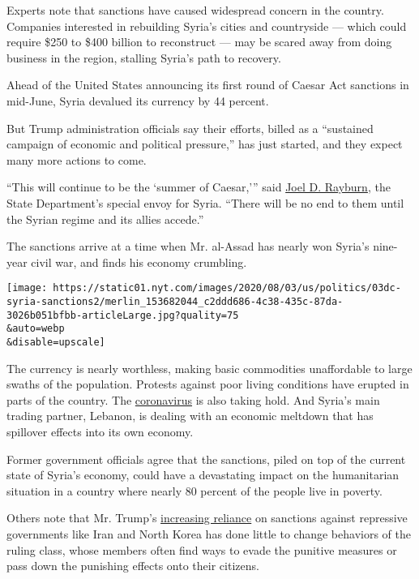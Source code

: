 Experts note that sanctions have caused widespread concern in the
country. Companies interested in rebuilding Syria's cities and
countryside --- which could require \$250 to \$400 billion to
reconstruct --- may be scared away from doing business in the region,
stalling Syria's path to recovery.

Ahead of the United States announcing its first round of Caesar Act
sanctions in mid-June, Syria devalued its currency by 44 percent.

But Trump administration officials say their efforts, billed as a
``sustained campaign of economic and political pressure,'' has just
started, and they expect many more actions to come.

``This will continue to be the `summer of Caesar,''' said
\href{https://www.state.gov/biographies/joel-d-rayburn/}{Joel D.
Rayburn}, the State Department's special envoy for Syria. ``There will
be no end to them until the Syrian regime and its allies accede.''

The sanctions arrive at a time when Mr. al-Assad has nearly won Syria's
nine-year civil war, and finds his economy crumbling.

\texttt{[image: https://static01.nyt.com/images/2020/08/03/us/politics/03dc-syria-sanctions2/merlin\_153682044\_c2ddd686-4c38-435c-87da-3026b051bfbb-articleLarge.jpg?quality=75\\\&auto=webp\\\&disable=upscale]}

The currency is nearly worthless, making basic commodities unaffordable
to large swaths of the population. Protests against poor living
conditions have erupted in parts of the country. The
\href{https://www.nytimes.com/interactive/2020/world/coronavirus-maps.html}{coronavirus}
is also taking hold. And Syria's main trading partner, Lebanon, is
dealing with an economic meltdown that has spillover effects into its
own economy.

Former government officials agree that the sanctions, piled on top of
the current state of Syria's economy, could have a devastating impact on
the humanitarian situation in a country where nearly 80 percent of the
people live in poverty.

Others note that Mr. Trump's
\href{https://www.nytimes.com/2019/11/15/us/politics/trump-iran-sanctions.html}{increasing
reliance} on sanctions against repressive governments like Iran and
North Korea has done little to change behaviors of the ruling class,
whose members often find ways to evade the punitive measures or pass
down the punishing effects onto their citizens.

